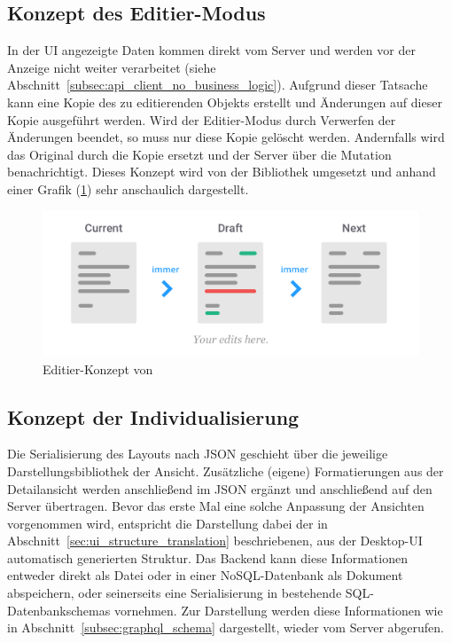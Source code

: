 \subsection{Konzept des Editier-Modus}
In der UI angezeigte Daten kommen direkt vom Server und werden vor der Anzeige nicht weiter verarbeitet (siehe Abschnitt~\ref{subsec:api_client_no_business_logic}). Aufgrund dieser Tatsache kann eine Kopie des zu editierenden Objekts erstellt und Änderungen auf dieser Kopie ausgeführt werden. Wird der Editier-Modus durch Verwerfen der Änderungen beendet, so muss nur diese Kopie gelöscht werden. Andernfalls wird das Original durch die Kopie ersetzt und der Server über die Mutation benachrichtigt. Dieses Konzept wird von der Bibliothek  \parencite{weststrate_2019} umgesetzt und anhand einer Grafik (\ref{fig:immer_draft_concept}) sehr anschaulich dargestellt.

\begin{figure}
    \centering
    \captionsetup{justification=centering}
    \includegraphics[width=\textwidth]{figures/immer_draft_concept.png}
        \caption{Editier-Konzept von  \parencite{weststrate_2019}}\label{fig:immer_draft_concept}
\end{figure}

\subsection{Konzept der Individualisierung}
Die Serialisierung des Layouts nach JSON geschieht über die jeweilige Darstellungsbibliothek der Ansicht. Zusätzliche (eigene) Formatierungen aus der Detailansicht werden anschließend im JSON ergänzt und anschließend auf den Server übertragen. Bevor das erste Mal eine solche Anpassung der Ansichten vorgenommen wird, entspricht die Darstellung dabei der in Abschnitt~\ref{sec:ui_structure_translation} beschriebenen, aus der Desktop-UI automatisch generierten Struktur. Das Backend kann diese Informationen entweder direkt als Datei oder in einer NoSQL-Datenbank als Dokument abspeichern, oder seinerseits eine Serialisierung in bestehende SQL-Datenbankschemas vornehmen. Zur Darstellung werden diese Informationen wie in Abschnitt~\ref{subsec:graphql_schema} dargestellt, wieder vom Server abgerufen.

